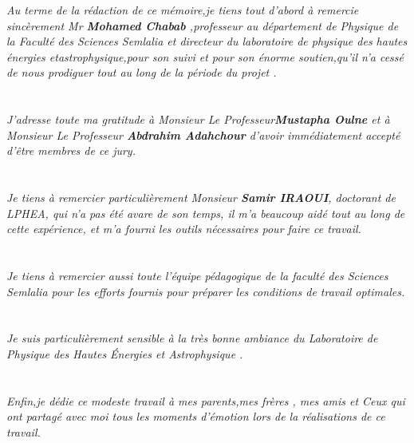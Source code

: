 \documentclass[12pt,  a4paper, openright]{report} %
\begin{document}
\textit{ Au terme de la rédaction de ce mémoire,je tiens tout d'abord à remercie sincèrement Mr \textbf{Mohamed Chabab} ,professeur au département de Physique de la Faculté des Sciences Semlalia et directeur du laboratoire de physique des hautes énergies etastrophysique,pour son suivi et pour son énorme soutien,qu'il n'a cessé de nous prodiguer tout au long de la période du projet .\\
	\\
	\\
	J'adresse toute ma gratitude à Monsieur Le Professeur\textbf{Mustapha Oulne}  et à Monsieur Le
	Professeur \textbf{Abdrahim Adahchour}  d'avoir immédiatement accepté d'être membres de ce jury.\\
	\\
	\\
	Je tiens à remercier particulièrement Monsieur \textbf{Samir IRAOUI}, doctorant de LPHEA, qui
	n'a pas été avare de son temps, il m'a beaucoup aidé tout au long de cette expérience, et m'a
	fourni les outils nécessaires pour faire ce travail.\\
	\\
	\\
	Je tiens à remercier aussi toute l’équipe pédagogique de la faculté des Sciences Semlalia pour
	les efforts fournis pour préparer les conditions de travail optimales.\\
	\\
	\\
	Je suis particulièrement sensible à la très bonne ambiance du Laboratoire de Physique des Hautes
	Énergies et Astrophysique .\\
	\\
	\\
	Enfin,je dédie ce modeste travail à mes parents,mes frères , mes amis et Ceux qui ont partagé avec moi tous les moments d'émotion lors de la réalisations de ce travail.}


\tableofcontents


	
\end{document}
